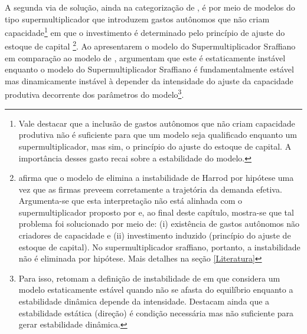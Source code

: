 A segunda via de solução, ainda na categorização de \textcite{allain_macroeconomic_2014}, é por meio de modelos do tipo supermultiplicador que introduzem gastos autônomos que não criam capacidade\footnote{Vale destacar que a inclusão de gastos autônomos que não criam capacidade produtiva não é suficiente para que um modelo seja qualificado enquanto um supermultiplicador, mas sim, o princípio do ajuste do estoque de capital. A importância desses gasto recai sobre a estabilidade do modelo.} em que o investimento é determinado pelo princípio de ajuste do estoque de capital \cites{serrano_long_1995}{serrano_sraffian_1995}{bortis_institutions_1996}\footnote{\textcite[p.~7]{allain_macroeconomic_2014} afirma que o modelo de \textcite{serrano_long_1995} elimina a instabilidade de Harrod por hipótese uma vez que as firmas preveem corretamente a trajetória da demanda efetiva. Argumenta-se que esta interpretação não está alinhada com o supermultiplicador proposto por \textcite{serrano_sraffian_1995} e, ao final deste capítulo, mostra-se que tal problema foi solucionado por meio de: (i) existência de gastos autônomos não criadores de capacidade e (ii) investimento induzido (princípio do ajuste de estoque de capital). No supermultiplicador sraffiano, portanto, a instabilidade não é eliminada por hipótese. Mais detalhes na seção \ref{Literatura}}.
Ao apresentarem o modelo do Supermultiplicador Sraffiano em comparação ao modelo de \textcite{harrod_essay_1939}, \textcite{serrano_trouble_2017} argumentam que este é estaticamente instável enquanto o modelo do Supermultiplicador Sraffiano é fundamentalmente estável mas dinamicamente instável à depender da intensidade do ajuste da capacidade produtiva decorrente dos parâmetros do modelo\footnote{Para isso, retomam a definição de instabilidade de \textcite{hicks_contribution_1972} em que considera um modelo estaticamente estável quando não se afasta do equilíbrio enquanto a estabilidade dinâmica depende da intensidade. Destacam ainda que a estabilidade estática (direção) é condição necessária mas não suficiente para gerar estabilidade dinâmica.}.

